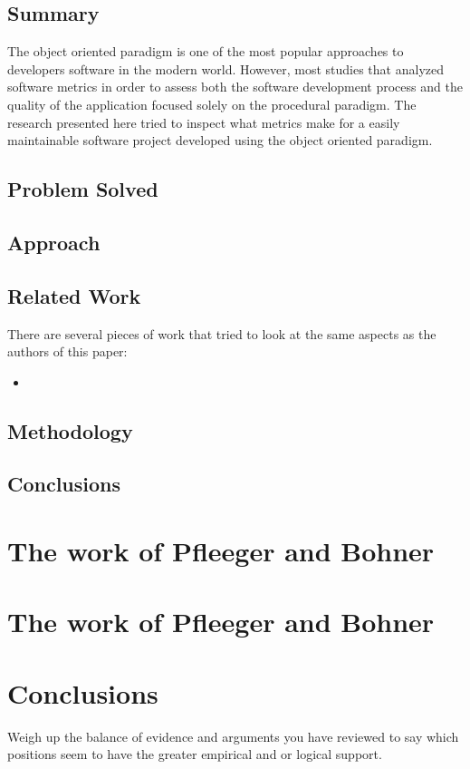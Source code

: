 \documentclass[a4paper,portrait,12pt]{article}
\begin{document}
\subsection{Summary}
 The object oriented paradigm is one of the most popular approaches to developers
 software in the modern world. However, most studies that analyzed software 
 metrics in order to assess both the software development process and the
 quality of the application focused solely on the procedural paradigm. 
 The research presented here tried to inspect what metrics make for a easily
 maintainable software project developed using the object oriented paradigm.

\subsection{Problem Solved}

\subsection{Approach}

\subsection{Related Work}
There are several pieces of work that tried to look at the same aspects as 
the authors of this paper:
 \begin{itemize}
  \item
 \end{itemize}

\subsection{Methodology}

\subsection{Conclusions}
 
\section{The work of Pfleeger and Bohner}

\section{The work of Pfleeger and Bohner}

\section{Conclusions}

Weigh up the balance of evidence and arguments you have reviewed to say which
positions seem to have the greater empirical and or logical support.



\end{document}
